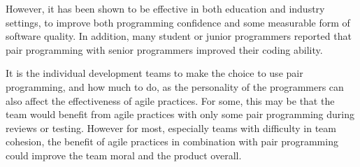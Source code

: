 \documentclass{scrartcl}
\begin{document}
However, it has been shown to be effective in both education and industry settings, to improve both programming confidence and some measurable form of software quality. In addition, many student or junior programmers reported that pair programming with senior programmers improved their coding ability.

It is the individual development teams to make the choice to use pair programming, and how much to do, as the personality of the programmers can also affect the effectiveness of agile practices. For some, this may be that the team would benefit from agile practices with only some pair programming during reviews or testing. However for most, especially teams with difficulty in team cohesion, the benefit of agile practices in combination with pair programming could improve the team moral and the product overall.



\end{document}
